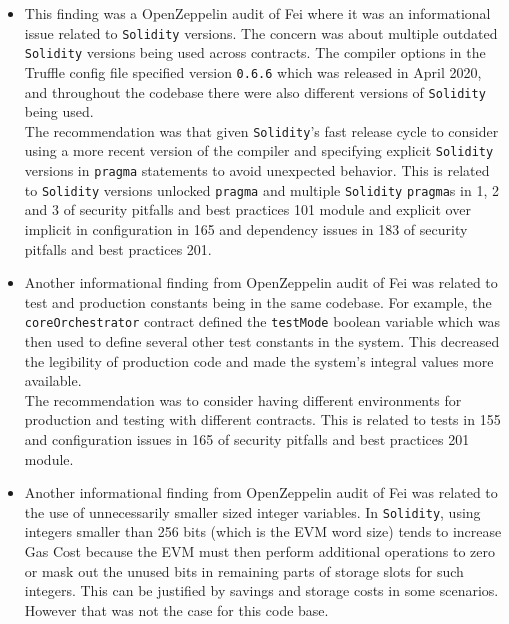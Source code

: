 \begin{itemize}
\item
  This finding was a OpenZeppelin audit of Fei where it was an
  informational issue related to \texttt{Solidity} versions. The concern
  was about multiple outdated \texttt{Solidity} versions being used
  across contracts. The compiler options in the Truffle config file
  specified version \texttt{0.6.6} which was released in April 2020, and
  throughout the codebase there were also different versions of
  \texttt{Solidity} being used.\\

  The recommendation was that given \texttt{Solidity}'s fast release
  cycle to consider using a more recent version of the compiler and
  specifying explicit \texttt{Solidity} versions in \texttt{pragma}
  statements to avoid unexpected behavior. This is related to
  \texttt{Solidity} versions unlocked \texttt{pragma} and multiple
  \texttt{Solidity} \texttt{pragma}s in 1, 2 and 3 of security pitfalls
  and best practices 101 module and explicit over implicit in
  configuration in 165 and dependency issues in 183 of security pitfalls
  and best practices 201.
\item
  Another informational finding from OpenZeppelin audit of Fei was
  related to test and production constants being in the same codebase.
  For example, the \texttt{coreOrchestrator} contract defined the
  \texttt{testMode} boolean variable which was then used to define
  several other test constants in the system. This decreased the
  legibility of production code and made the system's integral values
  more available.\\

  The recommendation was to consider having different environments for
  production and testing with different contracts. This is related to
  tests in 155 and configuration issues in 165 of security pitfalls and
  best practices 201 module.
\item
  Another informational finding from OpenZeppelin audit of Fei was
  related to the use of unnecessarily smaller sized integer variables.
  In \texttt{Solidity}, using integers smaller than 256 bits (which is
  the EVM word size) tends to increase Gas Cost because the EVM must
  then perform additional operations to zero or mask out the unused bits
  in remaining parts of storage slots for such integers. This can be
  justified by savings and storage costs in some scenarios. However that
  was not the case for this code base.\\


\end{itemize}

